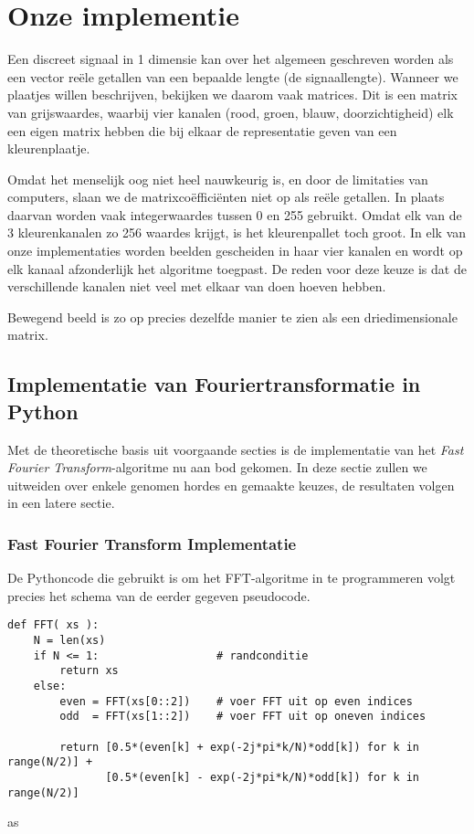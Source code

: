 \chapter{Onze implementie}

Een discreet signaal in 1 dimensie kan over het algemeen geschreven worden als een vector re\"ele getallen van een bepaalde lengte (de signaallengte). Wanneer we plaatjes willen beschrijven, bekijken we daarom vaak matrices. Dit is een matrix van grijswaardes, waarbij vier kanalen (rood, groen, blauw, doorzichtigheid) elk een eigen matrix hebben die bij elkaar de representatie geven van een kleurenplaatje.

Omdat het menselijk oog niet heel nauwkeurig is, en door de limitaties van computers, slaan we de matrixco\"effici\"enten niet op als re\"ele getallen. In plaats daarvan worden vaak integerwaardes tussen 0 en 255 gebruikt. Omdat elk van de 3 kleurenkanalen zo 256 waardes krijgt, is het kleurenpallet toch groot. In elk van onze implementaties worden beelden gescheiden in haar vier kanalen en wordt op elk kanaal afzonderlijk het algoritme toegpast. De reden voor deze keuze is dat de verschillende kanalen niet veel met elkaar van doen hoeven hebben.

Bewegend beeld is zo op precies dezelfde manier te zien als een driedimensionale matrix.

\section{Implementatie van Fouriertransformatie in Python}
Met de theoretische basis uit voorgaande secties is de implementatie van het 
\emph{Fast Fourier Transform}-algoritme nu aan bod gekomen. 
In deze sectie zullen we uitweiden over enkele genomen hordes en gemaakte keuzes, de resultaten volgen
in een latere sectie.

\subsection{Fast Fourier Transform Implementatie}
De Pythoncode die gebruikt is om het FFT-algoritme in te programmeren volgt precies het schema van de eerder gegeven pseudocode.

\begin{lstlisting}[caption={FFT algoritme in Python, voert de pseudocode uit zoals in sectie~\ref{fft_sec}}]
def FFT( xs ):
    N = len(xs)
    if N <= 1:                  # randconditie
        return xs
    else:
        even = FFT(xs[0::2])    # voer FFT uit op even indices
        odd  = FFT(xs[1::2])    # voer FFT uit op oneven indices

        return [0.5*(even[k] + exp(-2j*pi*k/N)*odd[k]) for k in range(N/2)] + 
               [0.5*(even[k] - exp(-2j*pi*k/N)*odd[k]) for k in range(N/2)]
\end{lstlisting}as

